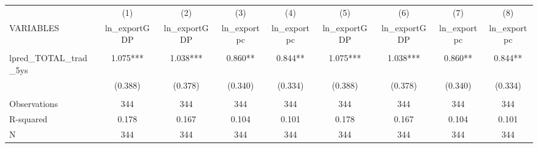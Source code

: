 \documentclass[]{article}
\begin{document}
\begin{tabular}{lcccccccc} \hline
 & (1) & (2) & (3) & (4) & (5) & (6) & (7) & (8) \\
VARIABLES & ln\_exportGDP & ln\_exportGDP & ln\_exportpc & ln\_exportpc & ln\_exportGDP & ln\_exportGDP & ln\_exportpc & ln\_exportpc \\ \hline
 &  &  &  &  &  &  &  &  \\
lpred\_TOTAL\_trad\_5ys & 1.075*** & 1.038*** & 0.860** & 0.844** & 1.075*** & 1.038*** & 0.860** & 0.844** \\
 & (0.388) & (0.378) & (0.340) & (0.334) & (0.388) & (0.378) & (0.340) & (0.334) \\
 &  &  &  &  &  &  &  &  \\
Observations & 344 & 344 & 344 & 344 & 344 & 344 & 344 & 344 \\
R-squared & 0.178 & 0.167 & 0.104 & 0.101 & 0.178 & 0.167 & 0.104 & 0.101 \\
 N & 344 & 344 & 344 & 344 & 344 & 344 & 344 & 344 \\ \hline
\end{tabular}
\end{document}
